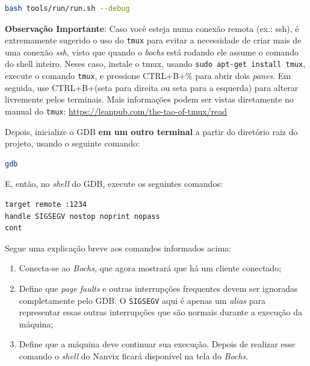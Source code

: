 \documentclass[11pt]{article}
\begin{document}
\begin{lstlisting}[language=bash,numbers=none,frame=single]
bash tools/run/run.sh --debug
\end{lstlisting}

\textbf{Observação Importante}: Caso você esteja numa conexão remota (ex.: ssh), é extremamente sugerido o uso do \texttt{tmux} para evitar a necessidade de criar mais de uma conexão \textit{ssh}, visto que quando o \textit{bochs} está rodando ele assume o comando do shell inteiro. Neses caso, instale o tmux, usando \texttt{sudo apt-get install tmux}, execute o comando \texttt{tmux}, e pressione CTRL+B+\% para abrir dois \textit{panes}. Em seguida, use CTRL+B+(seta para direita ou seta para a esquerda) para alterar livremente pelos terminais. Mais informações podem ser vistas diretamente no manual do \texttt{tmux}: \url{https://leanpub.com/the-tao-of-tmux/read}


Depois, inicialize o GDB \textbf{em um outro terminal} a partir do diretório raiz do projeto, usando o seguinte comando: \\

\begin{lstlisting}[language=bash,numbers=none,frame=single]
gdb
\end{lstlisting}

E, então, no \textit{shell} do GDB, execute os seguintes comandos:\\

\begin{lstlisting}[language=sh,numbers=none,frame=single]
target remote :1234
handle SIGSEGV nostop noprint nopass
cont
\end{lstlisting}

Segue uma explicação breve aos comandos informados acima:

\begin{enumerate}
	\item Conecta-se ao \textit{Bochs}, que agora mostrará que há um cliente conectado;
	\item Define que \textit{page faults} e outras interrupções frequentes devem ser ignoradas completamente pelo GDB. O \texttt{SIGSEGV} aqui é apenas um \textit{alias} para representar essas outras interrupções que são normais durante a execução da máquina;
	\item Define que a máquina deve continuar sua execução. Depois de realizar esse comando o \textit{shell} do Nanvix ficará disponível na tela do \textit{Bochs}.
\end{enumerate}
\end{document}

